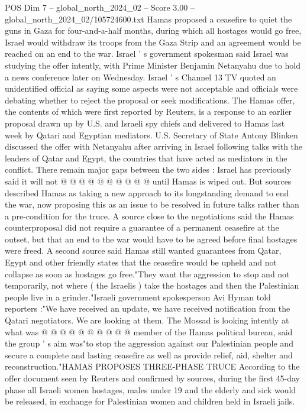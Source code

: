 \begin{textsample}{POS Dim 7 – global\_north\_2024\_02 – Score 3.00 – global\_north\_2024\_02/105724600.txt}  \label{ex:f7_pos_162}
Hamas proposed a ceasefire to quiet the guns in Gaza for four-and-a-half months, during which all hostages would go free, Israel would withdraw its troops from the Gaza Strip and an agreement would be reached on an end to the war.
Israel ' s government spokesman said Israel was studying the offer intently, with Prime Minister Benjamin Netanyahu due to hold a news conference later on Wednesday.
Israel ' s Channel 13 TV quoted an unidentified official as saying some aspects were not acceptable and officials were debating whether to reject the proposal or seek modifications.
The Hamas offer, the contents of which were first reported by Reuters, is a response to an earlier proposal drawn up by U.S. and Israeli spy chiefs and delivered to Hamas last week by Qatari and Egyptian mediators.
U.S.
Secretary of State Antony Blinken discussed the offer with Netanyahu after arriving in Israel following talks with the leaders of Qatar and Egypt, the countries that have acted as mediators in the conflict.
There remain major gaps between the two sides : Israel has previously said it will not @ @ @ @ @ @ @ @ @ @ until Hamas is wiped out.
But sources described Hamas as taking a new approach to its longstanding demand to end the war, now proposing this as an issue to be resolved in future talks rather than a pre-condition for the truce.
A source close to the negotiations said the Hamas counterproposal did not require a guarantee of a permanent ceasefire at the outset, but that an end to the war would have to be agreed before final hostages were freed.
A second source said Hamas still wanted guarantees from Qatar, Egypt and other friendly states that the ceasefire would be upheld and not collapse as soon as hostages go free."They want the aggression to stop and not temporarily, not where ( the Israelis ) take the hostages and then the Palestinian people live in a grinder."Israeli government spokesperson Avi Hyman told reporters :"We have received an update, we have received notification from the Qatari negotiators.
We are looking at them.
The Mossad is looking intently at what was @ @ @ @ @ @ @ @ @ @ member of the Hamas political bureau, said the group ' s aim was"to stop the aggression against our Palestinian people and secure a complete and lasting ceasefire as well as provide relief, aid, shelter and reconstruction."HAMAS PROPOSES THREE-PHASE TRUCE According to the offer document seen by Reuters and confirmed by sources, during the first 45-day phase all Israeli women hostages, males under 19 and the elderly and sick would be released, in exchange for Palestinian women and children held in Israeli jails.

\end{textsample}
